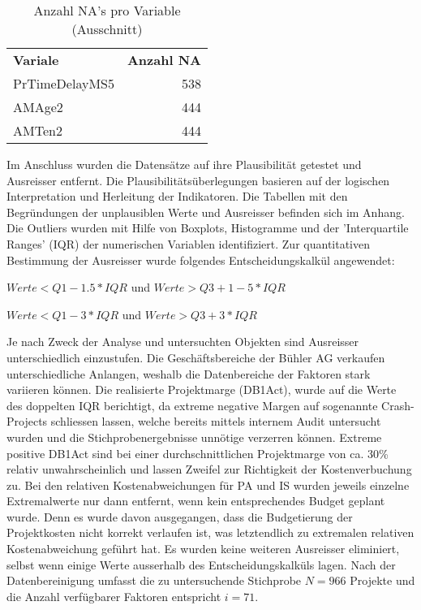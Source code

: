 \begin{table}[htbp]
	\centering
	\caption{Anzahl NA's pro Variable (Ausschnitt)}
	\begin{tabular}{lr}
		\textbf{Variale} & \multicolumn{1}{l}{\textbf{Anzahl NA}} \\
		PrTimeDelayMS5 & 538 \\
		AMAge2 & 444 \\
		AMTen2 & 444 \\
	\end{tabular}%
	\label{tab:addlabel}%
\end{table}%
Im Anschluss wurden die Datensätze auf ihre Plausibilität getestet und Ausreisser entfernt. Die Plausibilitätsüberlegungen basieren auf der logischen Interpretation und Herleitung der Indikatoren. Die Tabellen mit den Begründungen der unplausiblen Werte und Ausreisser befinden sich im Anhang. Die Outliers wurden mit Hilfe von Boxplots, Histogramme und der 'Interquartile Ranges' (IQR) der numerischen Variablen identifiziert. Zur quantitativen Bestimmung der Ausreisser wurde folgendes Entscheidungskalkül angewendet:
\newline\newline
\begin{centering}
	$ Werte < Q1 - 1.5 * IQR$ und $ Werte > Q3 + 1-5 * IQR$
\end{centering}
\newline\newline
\begin{centering}
	$ Werte < Q1 - 3 * IQR$ und $ Werte > Q3 + 3 * IQR$
\end{centering}
\newline\newline
Je nach Zweck der Analyse und untersuchten Objekten sind Ausreisser unterschiedlich einzustufen. Die Geschäftsbereiche der Bühler AG verkaufen unterschiedliche Anlangen, weshalb die Datenbereiche der Faktoren stark variieren können. Die realisierte Projektmarge (DB1Act), wurde auf die Werte des doppelten IQR berichtigt, da extreme negative Margen auf sogenannte Crash-Projects schliessen lassen, welche bereits mittels internem Audit untersucht wurden und die Stichprobenergebnisse unnötige verzerren können. Extreme positive DB1Act sind bei einer durchschnittlichen Projektmarge von ca. 30\% relativ unwahrscheinlich und lassen Zweifel zur Richtigkeit der Kostenverbuchung zu. Bei den relativen Kostenabweichungen für PA und IS wurden jeweils einzelne Extremalwerte nur dann entfernt, wenn kein entsprechendes Budget geplant wurde. Denn es wurde davon ausgegangen, dass die Budgetierung der Projektkosten nicht korrekt verlaufen ist, was letztendlich zu extremalen relativen Kostenabweichung geführt hat. Es wurden keine weiteren Ausreisser eliminiert, selbst wenn einige Werte ausserhalb des Entscheidungskalküls lagen. Nach der Datenbereinigung umfasst die zu untersuchende Stichprobe $N = 966$ Projekte und die Anzahl verfügbarer Faktoren entspricht $ i = 71$. 
